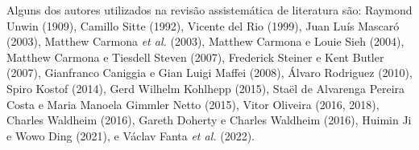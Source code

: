 \documentclass[12pt, a4paper]{book} %
\begin{document}
        Alguns dos autores utilizados na revisão assistemática de literatura são: Raymond Unwin (1909), Camillo Sitte (1992), Vicente del Rio (1999), Juan Luís Mascaró (2003), Matthew Carmona \textit{et al.} (2003), Matthew Carmona e Louie Sieh (2004), Matthew Carmona e Tiesdell Steven (2007), Frederick Steiner e Kent Butler (2007), Gianfranco Caniggia e Gian Luigi Maffei (2008), Álvaro Rodriguez (2010), Spiro Kostof (2014), Gerd Wilhelm Kohlhepp (2015), Staël de Alvarenga Pereira Costa e Maria Manoela Gimmler Netto (2015), Vitor Oliveira (2016, 2018), Charles Waldheim (2016), Gareth Doherty e Charles Waldheim (2016), Huimin Ji e Wowo Ding (2021), e Václav Fanta \textit{et al.} (2022).

                
\end{document}
